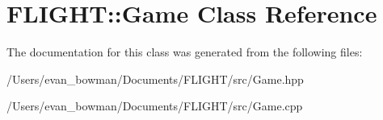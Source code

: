 \hypertarget{class_f_l_i_g_h_t_1_1_game}{}\section{F\+L\+I\+G\+HT\+:\+:Game Class Reference}
\label{class_f_l_i_g_h_t_1_1_game}


The documentation for this class was generated from the following files\+:\begin{DoxyCompactItemize}
\item 
/\+Users/evan\+\_\+bowman/\+Documents/\+F\+L\+I\+G\+H\+T/src/Game.\+hpp\item 
/\+Users/evan\+\_\+bowman/\+Documents/\+F\+L\+I\+G\+H\+T/src/Game.\+cpp\end{DoxyCompactItemize}
